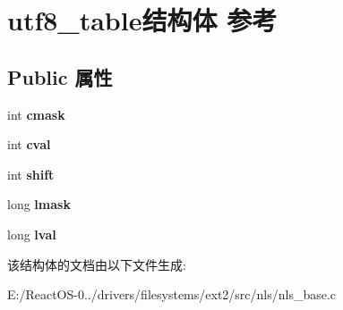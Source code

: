 \hypertarget{structutf8__table}{}\section{utf8\+\_\+table结构体 参考}
\label{structutf8__table}
\subsection*{Public 属性}
\begin{DoxyCompactItemize}
\item 
\mbox{\label{structutf8__table_a3b5a2ab01b7cec92681a6067e1fec202}} 
int {\bfseries cmask}
\item 
\mbox{\label{structutf8__table_ac16a9da1e7aca56a8b0f68cda20d7d3d}} 
int {\bfseries cval}
\item 
\mbox{\label{structutf8__table_ae8ec16819170e356a0d1a989560084e2}} 
int {\bfseries shift}
\item 
\mbox{\label{structutf8__table_a25c55a5fd2a1ad24ac6b7450f7efe68f}} 
long {\bfseries lmask}
\item 
\mbox{\label{structutf8__table_abdc16429a8b9e54d226900b9e24526d2}} 
long {\bfseries lval}
\end{DoxyCompactItemize}


该结构体的文档由以下文件生成\+:\begin{DoxyCompactItemize}
\item 
E\+:/\+React\+O\+S-\/0../drivers/filesystems/ext2/src/nls/nls\+\_\+base.\+c\end{DoxyCompactItemize}
